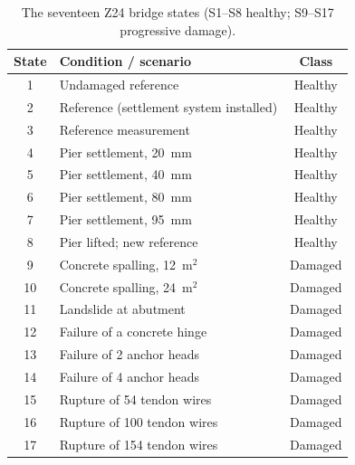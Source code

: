 \documentclass[11pt,a4paper]{article}
\begin{document}
\begin{table}[htbp]
\centering
\caption{The seventeen Z24 bridge states (S1--S8 healthy; S9--S17 progressive damage).}
\label{tab:states}
\small
\begin{tabular}{@{}clc@{}}
\toprule
State & Condition / scenario & Class \\
\midrule
1  & Undamaged reference                     & Healthy \\
2  & Reference (settlement system installed) & Healthy \\
3  & Reference measurement                   & Healthy \\
4  & Pier settlement, 20~mm                  & Healthy \\
5  & Pier settlement, 40~mm                  & Healthy \\
6  & Pier settlement, 80~mm                  & Healthy \\
7  & Pier settlement, 95~mm                  & Healthy \\
8  & Pier lifted; new reference              & Healthy \\
\midrule
9  & Concrete spalling, 12~m$^2$             & Damaged \\
10 & Concrete spalling, 24~m$^2$             & Damaged \\
11 & Landslide at abutment                   & Damaged \\
12 & Failure of a concrete hinge             & Damaged \\
13 & Failure of 2 anchor heads               & Damaged \\
14 & Failure of 4 anchor heads               & Damaged \\
15 & Rupture of 54 tendon wires              & Damaged \\
16 & Rupture of 100 tendon wires             & Damaged \\
17 & Rupture of 154 tendon wires             & Damaged \\
\bottomrule
\end{tabular}
\end{table}
\end{document}
